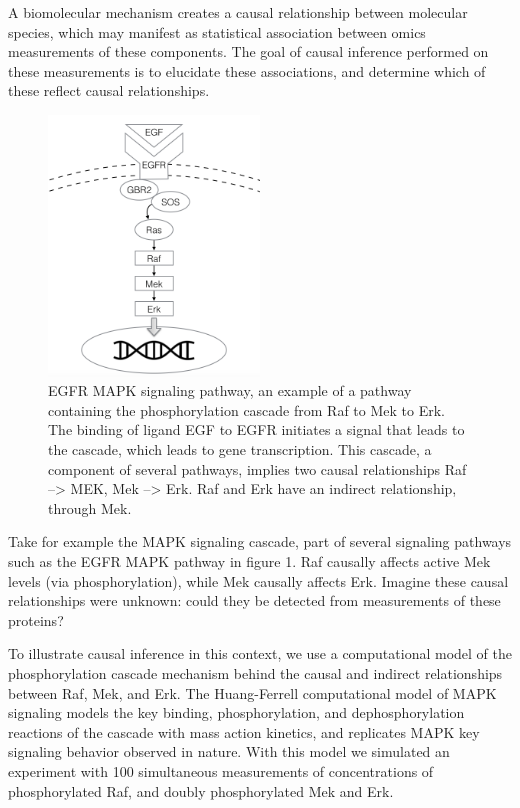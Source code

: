 \documentclass[journal=jacsat,manuscript=article]{achemso}
\begin{document}
A biomolecular mechanism creates a causal relationship between molecular species, which may manifest as statistical association between omics measurements of these components. The goal of causal inference performed on these measurements is to elucidate these associations, and determine which of these reflect causal relationships.

\begin{figure}[!tpb]
\centerline{\includegraphics[width=0.5\textwidth]{figs/egfr.png}}
\caption{EGFR MAPK signaling pathway, an example of a pathway containing the phosphorylation cascade from Raf to Mek to Erk.  The binding of ligand EGF to EGFR initiates a signal that leads to the cascade, which leads to gene transcription.  This cascade, a component of several pathways, implies two causal relationships Raf --> MEK, Mek --> Erk.  Raf and Erk have an indirect relationship, through Mek.}
\label{mapk}
\end{figure}

Take for example the MAPK signaling cascade, part of several signaling pathways such as the EGFR MAPK pathway in figure 1. Raf causally affects active Mek levels (via phosphorylation), while Mek causally affects Erk. Imagine these causal relationships were unknown: could they be detected from measurements of these proteins?  

To illustrate causal inference in this context, we use a computational model of the phosphorylation cascade mechanism behind the causal and indirect relationships between Raf, Mek, and Erk.   The Huang-Ferrell computational model of MAPK signaling models the key binding, phosphorylation, and dephosphorylation reactions of the cascade with mass action kinetics, and replicates MAPK key signaling behavior observed in nature.  With this model we simulated an experiment with 100 simultaneous measurements of concentrations of phosphorylated Raf, and doubly phosphorylated Mek and Erk. 
\end{document}
